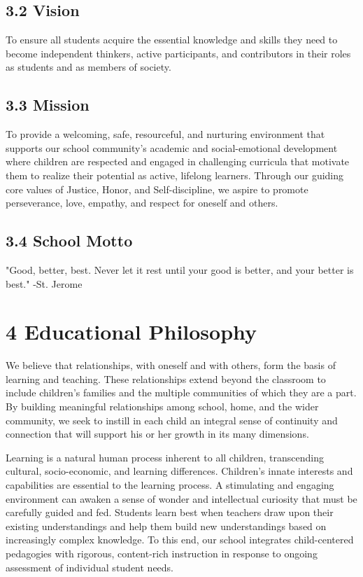 \documentclass[11pt]{article}
\begin{document}
\subsection{3.2 Vision}
\label{sec:org78bbaa8}

To ensure all students acquire the essential knowledge and skills they need to become independent thinkers, active participants, and contributors in their roles as students and as members of society.

\subsection{3.3 Mission}
\label{sec:orgcdc06b6}

To provide a welcoming, safe, resourceful, and nurturing environment that supports our school community’s academic and social-emotional development where children are respected and engaged in challenging curricula that motivate them to realize their potential as active, lifelong learners. Through our guiding core values of Justice, Honor, and Self-discipline, we aspire to promote perseverance, love, empathy, and respect for oneself and others.

\subsection{3.4 School Motto}
\label{sec:org38da518}

"Good, better, best. Never let it rest until your good is better, and your better is best." -St. Jerome
\section{4 Educational Philosophy}
\label{sec:orgd10165d}

We believe that relationships, with oneself and with others, form the basis of learning and teaching. These relationships extend beyond the classroom to include children’s families and the multiple communities of which they are a part. By building meaningful relationships among school, home, and the wider community, we seek to instill in each child an integral sense of continuity and connection that will support his or her growth in its many dimensions.

Learning is a natural human process inherent to all children, transcending cultural, socio-economic, and learning differences. Children’s innate interests and capabilities are essential to the learning process. A stimulating and engaging environment can awaken a sense of wonder and intellectual curiosity that must be carefully guided and fed. Students learn best when teachers draw upon their existing understandings and help them build new understandings based on increasingly complex knowledge. To this end, our school integrates child-centered pedagogies with rigorous, content-rich instruction in response to ongoing assessment of individual student needs.
\end{document}

